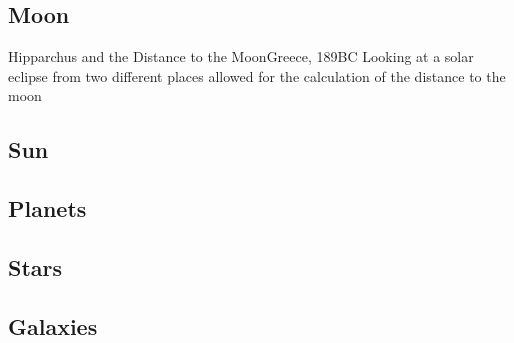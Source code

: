 \documentclass[12pt]{beamer}
\begin{document}
    \subsection{Moon}
        \begin{frame}{Hipparchus and the Distance to the Moon}{Greece, 189BC} \centering
            Looking at a solar eclipse from two different places allowed for the calculation of the distance to the moon
        \end{frame}
    \subsection{Sun}
    \subsection{Planets}
    \subsection{Stars}
    \subsection{Galaxies}
\end{document}

